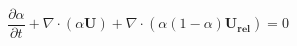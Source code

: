 \begin{equation}
\label{eq:vof_alpha}
\frac{\partial \alpha}{\partial t} + \nabla \cdot (\alpha \bm{U}) + \nabla \cdot (\alpha(1 - \alpha)\bm{U_{rel}}) = 0
\end{equation}